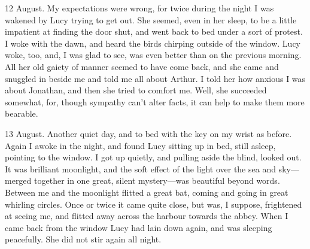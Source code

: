 \begin{diary}{12 August.}
My expectations were wrong, for twice during the night I was wakened by Lucy trying to get out. She seemed, even in her sleep, to be a little impatient at finding the door shut, and went back to bed under a sort of protest. I woke with the dawn, and heard the birds chirping outside of the window. Lucy woke, too, and, I was glad to see, was even better than on the previous morning. All her old gaiety of manner seemed to have come back, and she came and snuggled in beside me and told me all about Arthur. I told her how anxious I was about Jonathan, and then she tried to comfort me. Well, she succeeded somewhat, for, though sympathy can't alter facts, it can help to make them more bearable.
\end{diary}
 

\begin{diary}{13 August.}
Another quiet day, and to bed with the key on my wrist as before. Again I awoke in the night, and found Lucy sitting up in bed, still asleep, pointing to the window. I got up quietly, and pulling aside the blind, looked out. It was brilliant moonlight, and the soft effect of the light over the sea and sky—merged together in one great, silent mystery—was beautiful beyond words. Between me and the moonlight flitted a great bat, coming and going in great whirling circles. Once or twice it came quite close, but was, I suppose, frightened at seeing me, and flitted away across the harbour towards the abbey. When I came back from the window Lucy had lain down again, and was sleeping peacefully. She did not stir again all night.
\end{diary}
 

